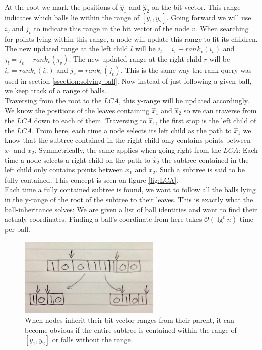 At the root we mark the positions of $\hat{y}_1$ and $\hat{y}_2$ on the bit vector. This range indicates which balls lie within the range of $[y_1, y_2]$. Going forward we will use $i_v$ and $j_v$ to indicate this range in the bit vector of the node $v$. When searching for points lying within this range, a node will update this range to fit its children. The new updated range at the left child $l$ will be $i_l = i_v - rank_v(i_v)$ and $j_l = j_v - rank_v(j_v)$. The new updated range at the right child $r$ will be $i_r = rank_v(i_v)$ and $j_r = rank_v(j_v)$. This is the same way the rank query was used in section \ref{ssection:solving-ball}. Now instead of just following a given ball, we keep track of a range of balls. \\

Traversing from the root to the $LCA$, this y-range will be updated accordingly. We know the positions of the leaves containing $\hat{x}_1$ and $\hat{x}_2$ so we can traverse from the $LCA$ down to each of them. Traversing to $\hat{x}_1$, the first stop is the left child of the $LCA$. From here, each time a node selects its left child as the path to $\hat{x}_1$ we know that the subtree contained in the right child only contains points between $x_1$ and $x_2$. Symmetrically, the same applies when going right from the $LCA$: Each time a node selects a right child on the path to $\hat{x}_2$ the subtree contained in the left child only contains points between $x_1$ and $x_2$. Such a subtree is said to be fully contained. This concept is seen on figure \ref{fig:LCA}. \\

Each time a fully contained subtree is found, we want to follow all the balls lying in the y-range of the root of the subtree to their leaves. This is exactly what the ball-inheritance solves: We are given a list of ball identities and want to find their actualy coordinates. Finding a ball's coordinate from here takes $\mathcal{O}(\lg^\epsilon n)$ time per ball.

\begin{figure}[H]
    \centering
    \includegraphics[width=0.6\textwidth]{pictures/bit_vector_split.png}
    \caption{When nodes inherit their bit vector ranges from their parent, it can become obvious if the entire subtree is contained within the range of $[y_1, y_2]$ or falls without the range.}
    \label{fig:bitvectorsplit}
\end{figure}


